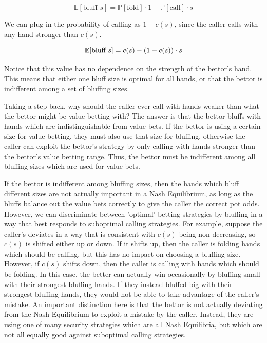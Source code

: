 \documentclass[a4paper,12pt]{article}
\begin{document}
\[ \mathbb{E}[\text{bluff } s] = \mathbb{P}[\text{fold}] \cdot 1 -\mathbb{P}[\text{call}] \cdot s \]

We can plug in the probability of calling as $1-c(s)$, since the caller calls with any hand stronger than $c(s)$.

\begin{equation}{\label{eq:bluff}}
    \mathbb{E}[\text{bluff } s] = c(s) - (1-c(s)) \cdot s
\end{equation}

Notice that this value has no dependence on the strength of the bettor's hand. This means that either one bluff size is optimal for all hands, or that the bettor is indifferent among a set of bluffing sizes. 

Taking a step back, why should the caller ever call with hands weaker than what the bettor might be value betting with? The answer is that the bettor bluffs with hands which are indistinguishable from value bets. If the bettor is using a certain size for value betting, they must also use that size for bluffing, otherwise the caller can exploit the bettor's strategy by only calling with hands stronger than the bettor's value betting range. Thus, the bettor must be indifferent among all bluffing sizes which are used for value bets.

If the bettor is indifferent among bluffing sizes, then the hands which bluff different sizes are not actually important in a Nash Equilibrium, as long as the bluffs balance out the value bets correctly to give the caller the correct pot odds. However, we can discriminate between 'optimal' betting strategies by bluffing in a way that best responds to suboptimal calling strategies. For example, suppose the caller's deviates in a way that is consistent with $c(s)$ being non-decreasing, so $c(s)$ is shifted either up or down. If it shifts up, then the caller is folding hands which should be calling, but this has no impact on choosing a bluffing size. However, if $c(s)$ shifts down, then the caller is calling with hands which should be folding. In this case, the better can actually win occasionally by bluffing small with their strongest bluffing hands. If they instead bluffed big with their strongest bluffing hands, they would not be able to take advantage of the caller's mistake. An important distinction here is that the bettor is not actually deviating from the Nash Equilibrium to exploit a mistake by the caller. Instead, they are using one of many security strategies which are all Nash Equilibria, but which are not all equally good against suboptimal calling strategies. 
\end{document}
